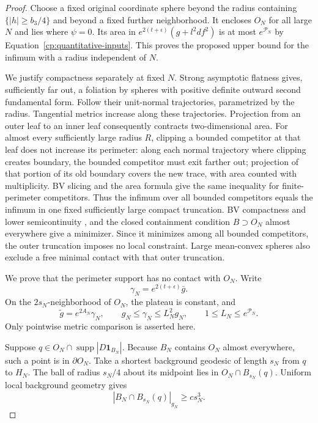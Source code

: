 \begin{proof}
Choose a fixed original coordinate sphere beyond the radius containing
$\{|h|\ge b_3/4\}$ and beyond a fixed further neighborhood.  It encloses
$O_N$ for all large $N$ and lies where $\psi=0$.  Its area in
$e^{2(t+\epsilon)}(g+l^2df^2)$ is at most $e^{\mathcal P_N}$ by
Equation~\eqref{cp:quantitative-inputs}.  This proves the proposed
upper bound for the infimum with a radius independent of $N$.

We justify compactness separately at fixed $N$.  Strong asymptotic
flatness gives, sufficiently far out, a foliation by spheres with
positive definite outward second fundamental form.  Follow their
unit-normal trajectories, parametrized by the radius.  Tangential
metrics increase along these trajectories.  Projection from an outer
leaf to an inner leaf consequently contracts two-dimensional area.
For almost every sufficiently large radius $R$, clipping a bounded
competitor at that leaf does not increase its perimeter: along each
normal trajectory where clipping creates boundary, the bounded
competitor must exit farther out; projection of that portion of its
old boundary covers the new trace, with area counted with
multiplicity.  BV slicing and the area formula give the same
inequality for finite-perimeter competitors.  Thus the infimum over
all bounded competitors equals the infimum in one fixed sufficiently
large compact truncation.  BV compactness and lower semicontinuity
\cite[Theorem~3.23 and Proposition~3.6]{AmbrosioFuscoPallara2000}, and
the closed containment condition $B\supset O_N$ almost everywhere
give a minimizer.  Since it minimizes among all bounded competitors,
the outer truncation imposes no local constraint.  Large
mean-convex spheres also exclude a free minimal contact with that
outer truncation.

We prove that the perimeter support has no contact with $O_N$.
Write
\[
 \gamma_N=e^{2(t+\epsilon)}\bar g.
\]
On the $2s_N$-neighborhood of $O_N$, the plateau is constant, and
\begin{equation}\label{cp:plateau-comparison}
 \widetilde g=e^{2A_N}\gamma_N,
 \qquad g_N\le\gamma_N\le L_N^2 g_N,
 \qquad 1\le L_N\le e^{\mathcal P_N}.
\end{equation}
Only pointwise metric comparison is asserted here.

Suppose $q\in O_N\cap\operatorname{supp}|D\mathbf1_{B_N}|$.
Because $B_N$ contains $O_N$ almost everywhere, such a point is in
$\partial O_N$.  Take a shortest background geodesic of length $s_N$
from $q$ to $H_N$.  The ball of radius $s_N/4$ about its midpoint lies
in $O_N\cap B_{s_N}(q)$.  Uniform local background geometry gives
\begin{equation}\label{cp:filled-density}
 |B_N\cap B_{s_N}(q)|_{g_N}\ge c s_N^3.
\end{equation}


\end{proof}
